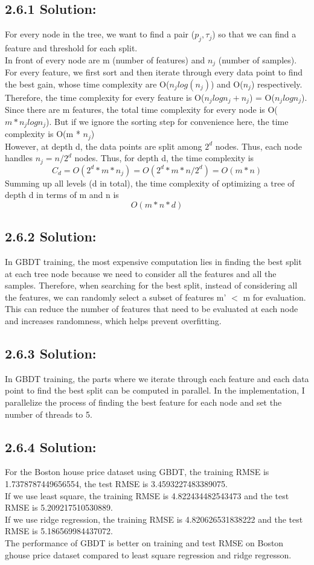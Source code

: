 \documentclass{article}
\begin{document}
\subsection*{2.6.1 Solution:}
For every node in the tree, we want to find a pair ($p_j, \tau_j$) so that we can find a feature and threshold for each split. \\
In front of every node are m (number of features) and $n_j$ (number of samples). For every feature, we first sort and then iterate through every data point to find the best gain, whose time complexity are O($n_j log(n_j)$) and O($n_j$) respectively.
Therefore, the time complexity for every feature is O($n_j log n_j + n_j$) = O($n_j log n_j$). Since there are m features, the total time complexity for every node is O($m * n_j log n_j$). But if we ignore the sorting step for convenience here, the time complexity is O(m * $n_j$)\\
However, at depth d, the data points are split among $2^d$ nodes. Thus, each node handles $n_j = n / 2^d$ nodes. Thus, for depth d, the time complexity is
\[C_d = O(2^d * m * n_j) = O(2^d * m * n / 2^d) = O(m * n)\]
Summing up all levels (d in total), the time complexity of optimizing a tree of depth d in terms of m and n is 
\[O(m * n * d)\]

\subsection*{2.6.2 Solution:}
In GBDT training, the most expensive computation lies in  finding the best split at each tree node because we need
to consider all the features and all the samples. Therefore, when searching for the best split, instead of considering all the features, we can 
randomly select a subset of features m' $<$ m for evaluation. This can reduce the number of features that need to be evaluated at each node and increases randomness, which helps prevent overfitting.

\subsection*{2.6.3 Solution:}
In GBDT training, the parts where we iterate through each feature and each data point to find the best split can be computed in parallel.
In the implementation, I parallelize the process of finding the best feature for each node and set the number of threads to 5.

\subsection*{2.6.4 Solution:}
For the Boston house price dataset using GBDT, the training RMSE is 1.7378787449656554, the test RMSE is 3.4593227483389075.\\
If we use least square, the training RMSE is 4.822434482543473 and the test RMSE is 5.209217510530889.\\
If we use ridge regression, the training RMSE is 4.820626531838222 and the test RMSE is 5.186569984437072.\\
The performance of GBDT is better on training and test RMSE on Boston ghouse price dataset compared to least square regression and ridge regresson.
\end{document}
